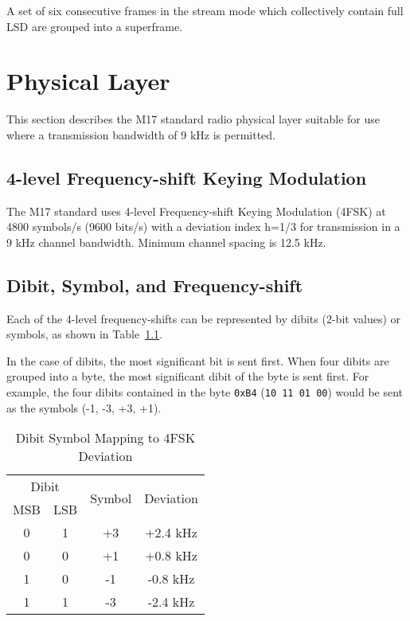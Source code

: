 \documentclass[a4paper,11pt,oneside]{book}
\makeatletter
\renewcommand{\mainmatter}{\cleardoublepage\@mainmattertrue}
\makeatother
\begin{document}
A set of six consecutive frames in the stream mode which collectively contain full LSD are grouped into a superframe.

\mainmatter
\chapter{Physical Layer}

This section describes the M17 standard radio physical layer suitable
for use where a transmission bandwidth of 9 kHz is permitted.

\section{4-level Frequency-shift Keying Modulation}

The M17 standard uses 4-level Frequency-shift Keying Modulation (4FSK) at 4800 symbols/s (9600 bits/s) with a deviation index h=1/3 for transmission in a 9 kHz channel bandwidth. Minimum channel spacing is 12.5 kHz.

\section{Dibit, Symbol, and Frequency-shift}

Each of the 4-level frequency-shifts can be represented by dibits (2-bit values) or symbols, as shown in Table~\ref{tab:dibit_symbol_mapping}.

In the case of dibits, the most significant bit is sent first. When four dibits are grouped into a byte, the most significant dibit of the byte
is sent first. For example, the four dibits contained in the byte \texttt{0xB4} (\texttt{10 11 01 00}) would be sent as the symbols (-1, -3, +3, +1).

\begin{table}[H]
	\centering
	\begin{tabular}{|c|c|c|c|}
		\hline
		\multicolumn{2}{|c|}{Dibit} & \multirow{2}{*}{Symbol} & \multirow{2}{*}{Deviation} \\
		MSB & LSB &  &  \\
		\hline
		0 & 1 & +3 & +2.4 kHz \\
		0 & 0 & +1 & +0.8 kHz \\
		1 & 0 & -1 & -0.8 kHz \\
		1 & 1 & -3 & -2.4 kHz \\
		\hline
	\end{tabular}
	\caption{Dibit Symbol Mapping to 4FSK Deviation}
	\label{tab:dibit_symbol_mapping}
\end{table}
\end{document}
